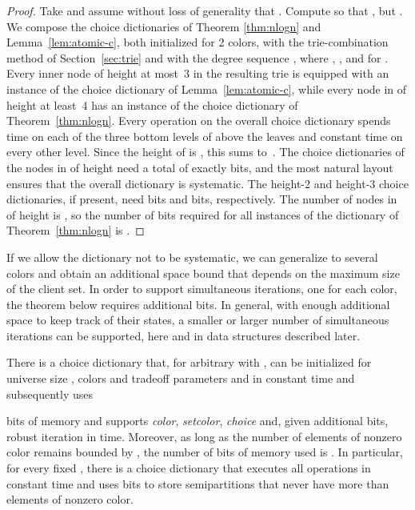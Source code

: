\documentclass[envcountsame,envcountsect,undated,nolinenumbers]{lnthi}
\def\Tvn#1{\hbox{\textit{#1\/}}}
\begin{document}
\begin{proof}
Take  and assume without loss of generality that .
Compute  so that
, but .
We compose the choice dictionaries of
Theorem \ref{thm:nlogn}
and Lemma~\ref{lem:atomic-c}, both
initialized for 2 colors,
with the trie-combination method of
Section~\ref{sec:trie} and with the degree
sequence ,
where ,
, and
 for .
Every inner node of height at most~3 in the resulting trie 
is equipped with an instance of the choice dictionary
of Lemma~\ref{lem:atomic-c},
while every node in 
of height at least~4
has an instance of
the choice dictionary of Theorem~\ref{thm:nlogn}.
Every operation
on the overall choice dictionary spends 
time on each of the three bottom levels of  above the leaves
and constant time on every other level.
Since the height of  is , this
sums to~.
The choice dictionaries of the nodes in 
of height  need a total of exactly  bits,
and the most natural layout ensures that the
overall dictionary is systematic.
The height-2 and height-3 choice dictionaries,
if present, need
 bits and  bits,
respectively.
The number of nodes in  of height 
is , so
the number of bits required for all instances
of the dictionary of Theorem~\ref{thm:nlogn}
is .
\end{proof}

If we allow 
the dictionary not to be systematic,
we can generalize to several colors and
obtain an additional space bound that depends
on the maximum size of the client set.
In order to support  simultaneous iterations,
one for each color, the theorem below requires
 additional bits.
In general, with enough additional space to keep
track of their states, a smaller or larger number
of simultaneous iterations can be supported,
here and in data structures described later.

\begin{theorem}
\label{thm:m-c}There is a choice dictionary
that, for arbitrary 
with ,
can be initialized
for universe size ,  colors
and tradeoff parameters  and 
in constant time and subsequently uses

bits of memory
and supports \Tvn{color}, \Tvn{setcolor},
\Tvn{choice} and,
given  additional bits, robust
iteration in  time.
Moreover, as long as the number of elements
of nonzero color
remains bounded by ,
the number of bits of memory used is
.
In particular, for every fixed , there is
a choice dictionary that executes all
operations in constant time and uses
 bits to store
semipartitions that never have more than~
elements of nonzero color.
\end{theorem}
\end{document}
